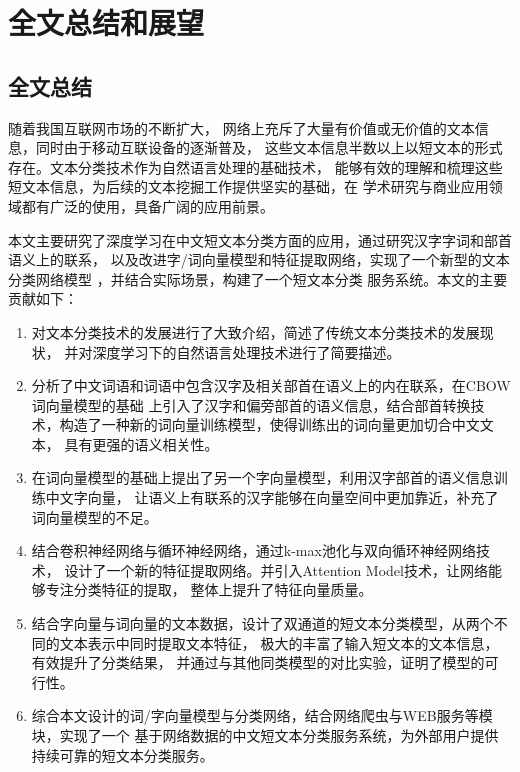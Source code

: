 \chapter{全文总结和展望}
\section{全文总结}
随着我国互联网市场的不断扩大，
网络上充斥了大量有价值或无价值的文本信息，同时由于移动互联设备的逐渐普及，
这些文本信息半数以上以短文本的形式存在。文本分类技术作为自然语言处理的基础技术，
能够有效的理解和梳理这些短文本信息，为后续的文本挖掘工作提供坚实的基础，在
学术研究与商业应用领域都有广泛的使用，具备广阔的应用前景。

本文主要研究了深度学习在中文短文本分类方面的应用，通过研究汉字字词和部首语义上的联系，
以及改进字/词向量模型和特征提取网络，实现了一个新型的文本分类网络模型
，并结合实际场景，构建了一个短文本分类
服务系统。本文的主要贡献如下：
\begin{enumerate}
    \item 对文本分类技术的发展进行了大致介绍，简述了传统文本分类技术的发展现状，
    并对深度学习下的自然语言处理技术进行了简要描述。
    \item 分析了中文词语和词语中包含汉字及相关部首在语义上的内在联系，在CBOW词向量模型的基础
    上引入了汉字和偏旁部首的语义信息，结合部首转换技术，构造了一种新的词向量训练模型，使得训练出的词向量更加切合中文文本，
    具有更强的语义相关性。
    \item 在词向量模型的基础上提出了另一个字向量模型，利用汉字部首的语义信息训练中文字向量，
    让语义上有联系的汉字能够在向量空间中更加靠近，补充了词向量模型的不足。
    \item 结合卷积神经网络与循环神经网络，通过k-max池化与双向循环神经网络技术，
    设计了一个新的特征提取网络。并引入Attention Model技术，让网络能够专注分类特征的提取，
    整体上提升了特征向量质量。
    \item 结合字向量与词向量的文本数据，设计了双通道的短文本分类模型，从两个不同的文本表示中同时提取文本特征，
    极大的丰富了输入短文本的文本信息，有效提升了分类结果，
    并通过与其他同类模型的对比实验，证明了模型的可行性。
    \item 综合本文设计的词/字向量模型与分类网络，结合网络爬虫与WEB服务等模块，实现了一个
    基于网络数据的中文短文本分类服务系统，为外部用户提供持续可靠的短文本分类服务。
\end{enumerate}
